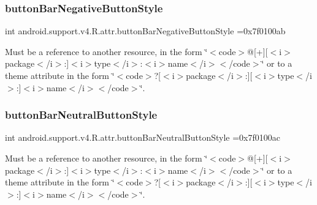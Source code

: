 \subsubsection{\texorpdfstring{button\+Bar\+Negative\+Button\+Style}{buttonBarNegativeButtonStyle}}
{\footnotesize\ttfamily int android.\+support.\+v4.\+R.\+attr.\+button\+Bar\+Negative\+Button\+Style =0x7f0100ab\hspace{0.3cm}{\ttfamily [static]}}

Must be a reference to another resource, in the form \char`\"{}$<$code$>$@\mbox{[}+\mbox{]}\mbox{[}$<$i$>$package$<$/i$>$\+:\mbox{]}$<$i$>$type$<$/i$>$\+:$<$i$>$name$<$/i$>$$<$/code$>$\char`\"{} or to a theme attribute in the form \char`\"{}$<$code$>$?\mbox{[}$<$i$>$package$<$/i$>$\+:\mbox{]}\mbox{[}$<$i$>$type$<$/i$>$\+:\mbox{]}$<$i$>$name$<$/i$>$$<$/code$>$\char`\"{}. \mbox{\label{classandroid_1_1support_1_1v4_1_1R_1_1attr_a67442feaeed5f77a8c983a06db98cbac}} 
\subsubsection{\texorpdfstring{button\+Bar\+Neutral\+Button\+Style}{buttonBarNeutralButtonStyle}}
{\footnotesize\ttfamily int android.\+support.\+v4.\+R.\+attr.\+button\+Bar\+Neutral\+Button\+Style =0x7f0100ac\hspace{0.3cm}{\ttfamily [static]}}

Must be a reference to another resource, in the form \char`\"{}$<$code$>$@\mbox{[}+\mbox{]}\mbox{[}$<$i$>$package$<$/i$>$\+:\mbox{]}$<$i$>$type$<$/i$>$\+:$<$i$>$name$<$/i$>$$<$/code$>$\char`\"{} or to a theme attribute in the form \char`\"{}$<$code$>$?\mbox{[}$<$i$>$package$<$/i$>$\+:\mbox{]}\mbox{[}$<$i$>$type$<$/i$>$\+:\mbox{]}$<$i$>$name$<$/i$>$$<$/code$>$\char`\"{}. \mbox{\label{classandroid_1_1support_1_1v4_1_1R_1_1attr_a777a1df76dd19b37852b5b0b343933dc}} 

